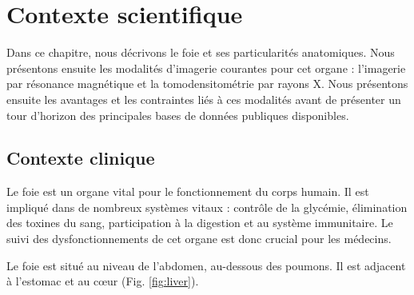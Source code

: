 %

\chapter{Contexte scientifique}
\label{sec:contexte}
 Dans ce chapitre, nous décrivons le foie et ses particularités anatomiques. Nous présentons ensuite les modalités d'imagerie courantes pour cet organe : l'imagerie par résonance magnétique et la tomodensitométrie par rayons X. Nous présentons ensuite les avantages et les contraintes liés à ces modalités avant de présenter un tour d'horizon des principales bases de données publiques disponibles.
\section{Contexte clinique}
\label{sec:contexte:clinique}
Le foie est un organe vital pour le fonctionnement du corps humain. Il est impliqué dans de nombreux systèmes vitaux : contrôle de la glycémie, élimination des toxines du sang, participation à la digestion et au système immunitaire. Le suivi des dysfonctionnements de cet organe est donc crucial pour les médecins.

Le foie est situé au niveau de l'abdomen, au-dessous des poumons. Il est adjacent à l'estomac et au cœur (Fig. \ref{fig:liver}).

